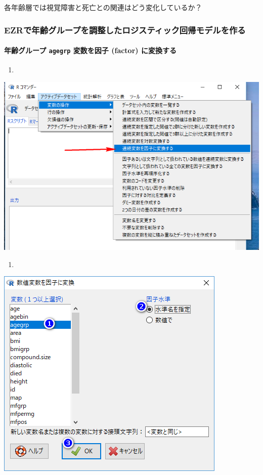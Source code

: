 \documentclass[11pt,]{problemset}
\let\oldparagraph\paragraph
\renewcommand{\paragraph}[1]{\oldparagraph{#1}\mbox{}}
\begin{document}
各年齢層では視覚障害と死亡との関連はどう変化しているか？

\newpage

\hypertarget{ezr}{%
\subsubsection{EZRで年齢グループを調整したロジスティック回帰モデルを作る}\label{ezr}}

\hypertarget{-agegrp--factor-}{%
\paragraph{\texorpdfstring{年齢グループ \texttt{agegrp} 変数を因子
(factor)
に変換する}{年齢グループ agegrp 変数を因子 (factor) に変換する}}\label{-agegrp--factor-}}

\begin{enumerate}
\def\labelenumi{\arabic{enumi}.}
\item
\end{enumerate}

\begin{center}\includegraphics[width=0.55\linewidth,height=0.5\textheight]{pic/mltlogstic00} \end{center}

\begin{enumerate}
\def\labelenumi{\arabic{enumi}.}
\setcounter{enumi}{1}
\item
\end{enumerate}

\begin{center}\includegraphics[width=0.55\linewidth,height=0.5\textheight]{pic/mltlogstic01} \end{center}
\end{document}
